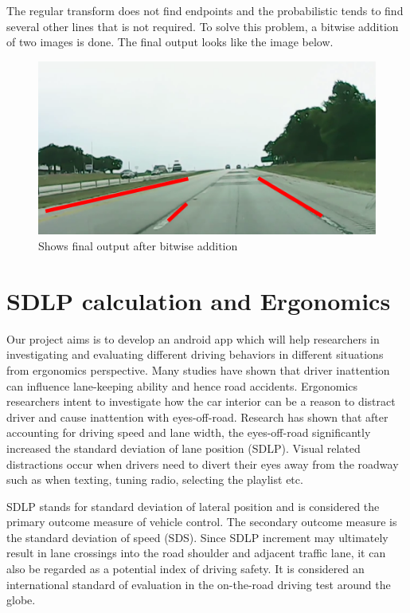 The regular transform does not find endpoints and the probabilistic tends to find several other lines that is not required. To solve this problem, a bitwise addition of two images is done. The final output looks like the image below.

\begin{figure}[H]
\begin{center}
    \includegraphics[scale=0.6]{img/lane9.png}
\end{center}
\caption{Shows final output after bitwise addition}
\label{fig:lane9}
\end{figure}

\section{SDLP calculation and Ergonomics}

Our project aims is to develop an android app which will help researchers in investigating and evaluating different driving behaviors in different situations from ergonomics perspective. Many studies have shown that driver inattention can influence lane-keeping ability and hence road accidents. Ergonomics researchers intent to investigate how the car interior can be a reason to distract driver and cause inattention with eyes-off-road. Research has shown that after accounting for driving speed and lane width, the eyes-off-road significantly increased the standard deviation of lane position (SDLP). Visual related distractions occur when drivers need to divert their eyes away from the roadway such as when texting, tuning radio, selecting the playlist etc. 

SDLP stands for standard deviation of lateral position and is considered the primary outcome measure of vehicle control. The secondary outcome measure is the standard deviation of speed (SDS). Since SDLP increment may ultimately result in lane crossings into the road shoulder and adjacent traffic lane, it can also be regarded as a potential index of driving safety. It is considered an international standard of evaluation in the on-the-road driving test around the globe. 


